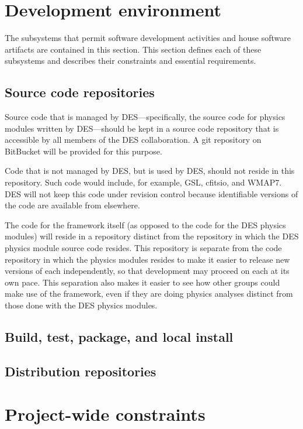 \documentclass[draftmode,draftwater]{memarticle}
\newcommand{\cosmosis}{\name{CosmoSIS}\xspace}
\begin{document}
\section{Development environment}

The subsystems that permit software development activities and house
software artifacts are contained in this section. This section defines
each of these subsystems and describes their constraints and essential
requirements.

\subsection{Source code repositories}

Source code that is managed by DES---specifically, the source code for
physics modules written by DES---should be kept in a source code
repository that is accessible by all members of the DES collaboration. A
git repository on BitBucket will be provided for this purpose.

Code that is not managed by DES, but is used by DES, should not reside
in this repository. Such code would include, for example, GSL, cfitsio,
and WMAP7. DES will not keep this code under revision control because
identifiable versions of the code are available from elsewhere.

The code for the \cosmosis framework itself (as opposed to the code for
the DES physics modules) will reside in a repository distinct from the
repository in which the DES physics module source code resides. This
repository is separate from the code repository in which the physics
modules resides to make it easier to release new versions of each
independently, so that development may proceed on each at its own pace.
This separation also makes it easier to see how other groups could make
use of the \cosmosis framework, even if they are doing physics analyses
distinct from those done with the DES physics modules.

\subsection{Build, test, package, and local install}

\subsection{Distribution repositories}

\section{Project-wide constraints}
\end{document}
